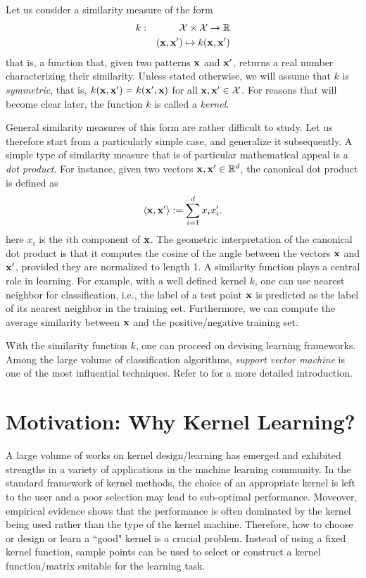 Let us consider a similarity measure of the form
\begin{eqnarray}
&k:&{\cal X}\times{\cal X}\rightarrow{\mathbb R}\nonumber\\
&&(\mathbf{x},\mathbf{x}')\mapsto k(\mathbf{x},\mathbf{x}')
\end{eqnarray}
that is, a function that, given two patterns $\mathbf{x}$ and $\mathbf{x}'$, returns a real number characterizing their similarity. Unless stated otherwise, we will assume that $k$ is {\em symmetric}, that is, $k(\mathbf{x},\mathbf{x}')=k(\mathbf{x}',\mathbf{x})$ for all $\mathbf{x},\mathbf{x}'\in{\cal X}$. For reasons that will become clear later, the function $k$ is called a {\em kernel}.

General similarity measures of this form are rather difficult to study. Let us therefore start from a particularly simple case, and generalize it subsequently. A simple type of similarity measure that is of particular mathematical appeal is a {\em dot product}. For instance, given two vectors $\mathbf{x}, \mathbf{x}'\in{\mathbb R}^d$, the canonical dot product is defined as
\[
\langle\mathbf{x},\mathbf{x}'\rangle:=\sum_{i=1}^dx_ix_i'.
\]
here $x_i$ is the $i$th component of $\mathbf{x}$. The geometric interpretation of the canonical dot product is that it computes the cosine of the angle between the vectors $\mathbf{x}$ and $\mathbf{x}'$, provided they are normalized to length 1. A similarity function plays a central role in learning. For example, with a well defined kernel $k$, one can use nearest neighbor for classification, i.e., the label of a test point $\mathbf{x}$ is predicted as the label of its nearest neighbor in the training set. Furthermore, we can compute the average similarity between $\mathbf{x}$ and the positive/negative training set.

With the similarity function $k$, one can proceed on devising learning frameworks. Among the large volume of classification algorithms, {\em support vector machine} is one of the most influential techniques. Refer to \cite{Scholkopf2002} for a more detailed introduction.

\section{Motivation: Why Kernel Learning?}

A large volume of works on kernel design/learning has emerged and exhibited strengths in a variety of applications in the machine learning community. In the standard framework of kernel methods, the choice of an appropriate kernel is left to the user and a poor selection may lead to sub-optimal performance. Moveover, empirical evidence shows that the performance is often dominated by the kernel being used rather than the type of the kernel machine. Therefore, how to choose or design or learn a ``good" kernel is a crucial problem. Instead of using a fixed kernel function, sample points can be used to select or construct a kernel function/matrix suitable for the learning task.

